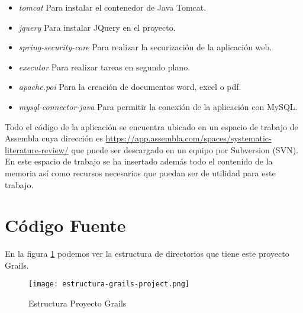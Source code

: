 \begin{itemize}
	\item \textit{tomcat} Para instalar el contenedor de Java Tomcat.
	\item \textit{jquery} Para instalar JQuery en el proyecto.
	\item \textit{spring-security-core} Para realizar la securización de la aplicación web.
	\item \textit{executor} Para realizar tareas en segundo plano.
	\item \textit{apache.poi} Para la creación de documentos word, excel o pdf.
	\item \textit{mysql-connector-java} Para permitir la conexión de la aplicación con MySQL.
\end{itemize}

Todo el código de la aplicación se encuentra ubicado en un espacio de trabajo de Assembla cuya dirección es \url{https://app.assembla.com/spaces/systematic-literature-review/} que puede ser descargado en un equipo por Subversion (SVN). En este espacio de trabajo se ha insertado además todo el contenido de la memoria así como recursos necesarios que puedan ser de utilidad para este trabajo.

\section{Código Fuente}

En la figura \ref{fig:estruc-grails} podemos ver la estructura de directorios que tiene este proyecto Grails.\\

\begin{figure}[!hpt]
	\begin{center} 
		\texttt{[image: estructura-grails-project.png]}
		\caption{Estructura Proyecto Grails}
		\label{fig:estruc-grails}
	\end{center}
\end{figure}

